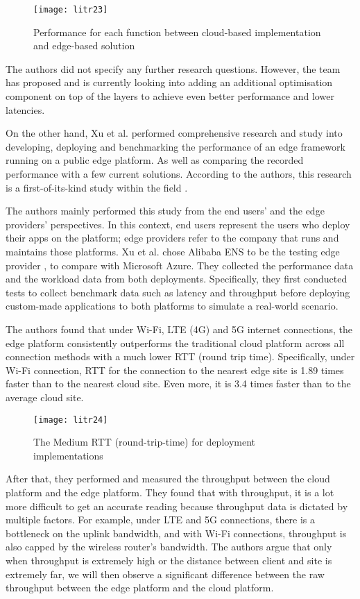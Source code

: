 \bigskip
\begin{figure}[hp]
\centering
\texttt{[image: litr23]}
\caption{\footnotesize{Performance for each function between cloud-based implementation and edge-based solution \cite{lit38}}}
\captionsetup{aboveskip=0pt,font=it}
\end{figure}
\bigskip

The authors did not specify any further research questions. However, the team has proposed and is currently looking into adding an additional optimisation component on top of the layers to achieve even better performance and lower latencies.

On the other hand, Xu et al. performed comprehensive research and study into developing, deploying and benchmarking the performance of an edge framework running on a public edge platform. As well as comparing the recorded performance with a few current solutions. According to the authors, this research is a first-of-its-kind study within the field \cite{lit41}.

The authors mainly performed this study from the end users’ and the edge providers’ perspectives. In this context, end users represent the users who deploy their apps on the platform; edge providers refer to the company that runs and maintains those platforms. Xu et al. chose Alibaba ENS to be the testing edge provider \cite{lit42}, to compare with Microsoft Azure. They collected the performance data and the workload data from both deployments. Specifically, they first conducted tests to collect benchmark data such as latency and throughput before deploying custom-made applications to both platforms to simulate a real-world scenario.

The authors found that under Wi-Fi, LTE (4G) and 5G internet connections, the edge platform consistently outperforms the traditional cloud platform across all connection methods with a much lower RTT (round trip time). Specifically, under Wi-Fi connection, RTT for the connection to the nearest edge site is 1.89 times faster than to the nearest cloud site. Even more, it is 3.4 times faster than to the average cloud site.

\bigskip
\begin{figure}[hp]
\centering
\texttt{[image: litr24]}
\caption{\footnotesize{The Medium RTT (round-trip-time) for deployment implementations \cite{lit41}}}
\captionsetup{aboveskip=0pt,font=it}
\end{figure}
\bigskip

After that, they performed and measured the throughput between the cloud platform and the edge platform. They found that with throughput, it is a lot more difficult to get an accurate reading because throughput data is dictated by multiple factors. For example, under LTE and 5G connections, there is a bottleneck on the uplink bandwidth, and with Wi-Fi connections, throughput is also capped by the wireless router’s bandwidth. The authors argue that only when throughput is extremely high or the distance between client and site is extremely far, we will then observe a significant difference between the raw throughput between the edge platform and the cloud platform.

